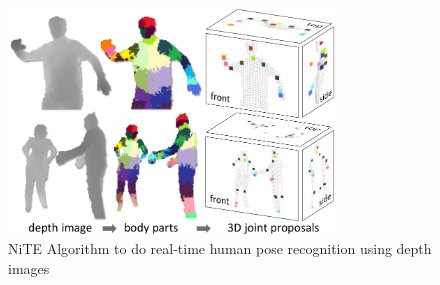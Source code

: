\begin{figure}
	[h] \centering 
	\includegraphics[height=6cm]{figures/content/ni-alg.png} \caption{NiTE Algorithm to do real-time human pose recognition using depth images} \label{fg:ni:alg} 
\end{figure}
